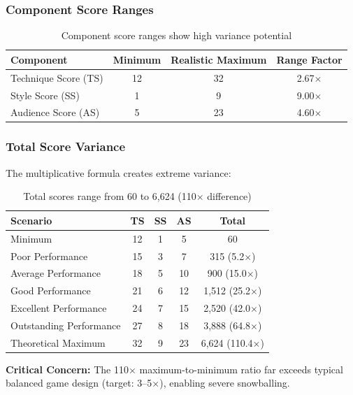 \documentclass[11pt,a4paper]{article}
\begin{document}
\subsubsection{Component Score Ranges}

\begin{table}[H]
\centering
\begin{tabular}{lccc}
\toprule
\textbf{Component} & \textbf{Minimum} & \textbf{Realistic Maximum} & \textbf{Range Factor} \\
\midrule
Technique Score (TS) & 12 & 32 & 2.67$\times$ \\
Style Score (SS) & 1 & 9 & 9.00$\times$ \\
Audience Score (AS) & 5 & 23 & 4.60$\times$ \\
\bottomrule
\end{tabular}
\caption{Component score ranges show high variance potential}
\end{table}

\subsubsection{Total Score Variance}

The multiplicative formula creates extreme variance:

\begin{table}[H]
\centering
\small
\begin{tabular}{lcccc}
\toprule
\textbf{Scenario} & \textbf{TS} & \textbf{SS} & \textbf{AS} & \textbf{Total} \\
\midrule
Minimum & 12 & 1 & 5 & 60 \\
Poor Performance & 15 & 3 & 7 & 315 (5.2$\times$) \\
Average Performance & 18 & 5 & 10 & 900 (15.0$\times$) \\
Good Performance & 21 & 6 & 12 & 1,512 (25.2$\times$) \\
Excellent Performance & 24 & 7 & 15 & 2,520 (42.0$\times$) \\
Outstanding Performance & 27 & 8 & 18 & 3,888 (64.8$\times$) \\
Theoretical Maximum & 32 & 9 & 23 & 6,624 (110.4$\times$) \\
\bottomrule
\end{tabular}
\caption{Total scores range from 60 to 6,624 (110$\times$ difference)}
\end{table}

\textbf{Critical Concern:} The 110$\times$ maximum-to-minimum ratio far exceeds typical balanced game design (target: 3--5$\times$), enabling severe snowballing.
\end{document}
